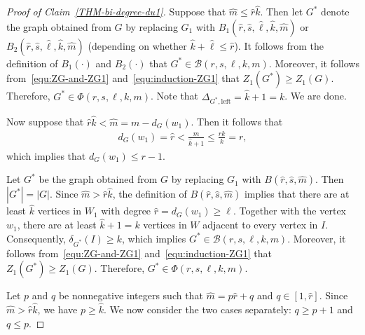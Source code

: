 \documentclass[10pt,a4paper]{amsart}
\begin{document}
    \begin{proof}[Proof of Claim~\ref{THM-bi-degree-du1}]
        Suppose that $\hat{m} \le \hat{r} \hat{k}$. 
        Then let $G^{\ast}$ denote the graph obtained from $G$ by replacing $G_1$ with $B_1(\hat{r}, \hat{s}, \hat{\ell}, \hat{k}, \hat{m})$ or $B_2(\hat{r}, \hat{s}, \hat{\ell}, \hat{k}, \hat{m})$ (depending on whether $\hat{k} + \hat{\ell} \le \hat{r}$).
        It follows from the definition of $B_1(\cdot)$ and $B_{2}(\cdot)$ that $G^{\ast} \in \mathcal{B}(r, s, \ell, k, m)$. 
        Moreover, it follows from~\eqref{equ:ZG-and-ZG1} and~\eqref{equ:induction-ZG1} that $Z_{1}(G^{\ast}) \ge Z_{1}(G)$. 
        Therefore, $G^{\ast} \in \Phi(r,s,\ell,k,m)$. 
        Note that $\Delta_{G^{\ast}, \mathrm{left}} = \hat{k} +1 =k$. 
        We are done. 

        Now suppose that $\hat{r} \hat{k} < \hat{m} = m-d_{G}(w_1)$. 
        Then it follows that 
        \begin{align*}
            d_{G}(w_1)
            = \hat{r}
            < \frac{m}{\hat{k}+1}
            \le \frac{rk}{k}
            = r, 
        \end{align*}
        which implies that $d_{G}(w_1) \le r-1$. 
        
        Let $G^{\ast}$ be the graph obtained from $G$ by replacing $G_1$ with $B(\hat{r}, \hat{s}, \hat{m})$. 
        Then $|G^{\ast}| = |G|$. 
        Since $\hat{m} > \hat{r}\hat{k}$, the definition of $B(\hat{r}, \hat{s}, \hat{m})$ implies that there are at least $\hat{k}$ vertices in $W_1$ with degree $\hat{r} = d_{G}(w_1) \ge \ell$. 
        Together with the vertex $w_1$, there are at least $\hat{k} + 1 = k$ vertices in $W$ adjacent to every vertex in $I$. 
        Consequently, $\delta_{G^{\ast}}(I) \ge k$, which implies $G^{\ast} \in \mathcal{B}(r,s,\ell,k,m)$. 
        Moreover, it follows from~\eqref{equ:ZG-and-ZG1} and~\eqref{equ:induction-ZG1} that $Z_{1}(G^{\ast}) \ge Z_{1}(G)$. 
        Therefore, $G^{\ast} \in \Phi(r,s,\ell,k,m)$. 
        
        Let $p$ and $q$ be nonnegative integers such that $\hat{m} = p \hat{r} + q$ and $q \in [1, \hat{r}]$. 
        Since $\hat{m} > \hat{r} \hat{k}$, we have $p \ge \hat{k}$. 
        We now consider the two cases separately: $q \ge p+1$ and $q \le p$.         


\end{proof}
\end{document}
